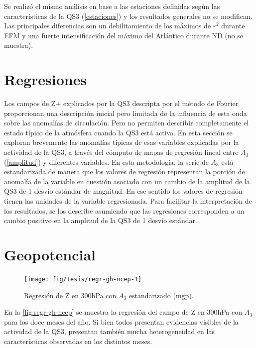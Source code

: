 \documentclass[spanish,a4paper,12pt,oneside]{book}
\begin{document}
Se realizó el mismo análisis en base a las estaciones definidas según
las características de la QS3 (\autoref{estaciones}) y los resultados
generales no se modifican. Las principales diferencias son un
debilitamiento de los máximos de \(r^2\) durante EFM y una fuerte
intensificación del máximo del Atlántico durante ND (no se muestra).

\section{Regresiones}\label{regresiones}

Los campos de Z+ explicados por la QS3 descripta por el método de
Fourier proporcionan una descripción inicial pero limitada de la
influencia de esta onda sobre las anomalías de circulación. Pero no
permiten describir completamente el estado típico de la atmósfera cuando
la QS3 está activa. En esta sección se exploran brevemente las anomalías
típicas de esas variables explicadas por la actividad de la QS3, a
través del cómputo de mapas de regresión lineal entre \(A_3\)
(\autoref{amplitud}) y diferentes variables. En esta metodología, la
serie de \(A_3\) está estandarizada de manera que los valores de
regresión representan la porción de anomalía de la variable en cuestión
asociado con un cambio de la amplitud de la QS3 de 1 desvío estándar de
magnitud. En ese sentido los valores de regresión tienen las unidades de
la variable regresionada. Para facilitar la interpretación de los
resultados, se los describe asumiendo que las regresiones corresponden a
un cambio positivo en la amplitud de la QS3 de 1 desvío estándar.

\section*{Geopotencial}

\begin{landscape}\begin{figure}

{\centering \texttt{[image: fig/tesis/regr-gh-ncep-1]} 

}

\caption{Regresión de Z en 300hPa con $A_3$ estandarizado (mgp).}\label{fig:regr-gh-ncep}
\end{figure}
\end{landscape}

En la \autoref{fig:regr-gh-ncep} se muestra la regresión del campo de Z
en 300hPa con \(A_3\) para los doce meses del año. Si bien todos
presentan evidencias visibles de la actividad de la QS3, presentan
también mucha heterogeneidad en las características observadas en los
distintos meses.
\end{document}
